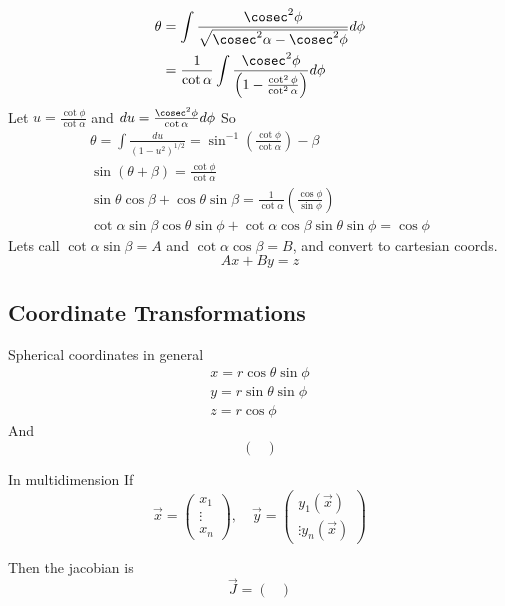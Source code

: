 \documentclass{E:/Documents/Latex/myassignment}
\begin{document}
\begin{align*}
	\theta &= \int \frac{\cosec^2\phi}{\sqrt{\cosec^2 \alpha - \cosec^2 \phi}} d\phi\\
	&= \frac{1}{\cot \alpha} \int \frac{\cosec^2 \phi}{\left(1 - \frac{\cot^2\phi}{\cot^2 \alpha}\right)} d\phi
\end{align*}
Let $u = \frac{\cot\phi}{\cot \alpha}$ and $du = \frac{\cosec^2\phi}{\cot \alpha} d\phi$
So
\begin{align*}
	\theta = \int \frac{du}{(1-u^2)^{1/2}} = \sin^{-1} \left(\frac{\cot\phi}{\cot \alpha}\right) - \beta\\
	\sin(\theta + \beta) = \frac{\cot \phi}{\cot \alpha}\\
	\sin\theta \cos \beta + \cos\theta \sin \beta = \frac{1}{\cot \alpha} \left(\frac{\cos\phi}{\sin\phi}\right)\\
	\cot \alpha \sin \beta \cos \theta \sin \phi + \cot \alpha \cos \beta \sin \theta \sin \phi = \cos \phi	
\end{align*}
Lets call $\cot \alpha\sin \beta = A$ and $\cot \alpha \cos \beta = B$, and convert to cartesian coords.
\[Ax + By = z\]


\subsection{Coordinate Transformations}

Spherical coordinates in general
\begin{align*}
	x = r\cos \theta \sin \phi\\
	y = r\sin\theta \sin \phi\\ 
	z = r\cos\phi
\end{align*}
And
\[\begin{pmatrix}
	
\end{pmatrix}\]

In multidimension
If
\[\vec x = \begin{pmatrix}
	x_1\\\vdots\\x_n
\end{pmatrix}, \quad \vec y = \begin{pmatrix}
	y_1(\vec x)\\\vdots y_n(\vec x)
\end{pmatrix}\]

Then the jacobian is
\[\vec J = \begin{pmatrix}
	
\end{pmatrix}\]
\end{document}
